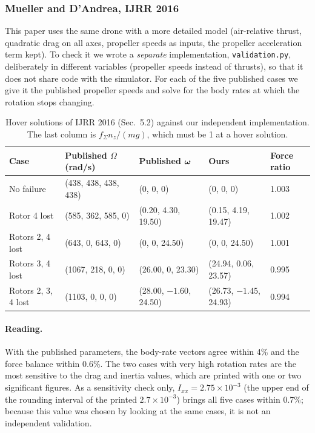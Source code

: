 \subsubsection{Mueller and D'Andrea, IJRR 2016}\label{sec:val-ijrr}
This paper uses the same drone with a more detailed model (air-relative thrust, quadratic drag on all axes, propeller speeds as inputs, the propeller acceleration term kept). To check it we wrote a \emph{separate} implementation, \texttt{validation.py}, deliberately in different variables (propeller speeds instead of thrusts), so that it does not share code with the simulator. For each of the five published cases we give it the published propeller speeds and solve for the body rates at which the rotation stops changing.

\begin{table}[h]
\centering\small
\caption{Hover solutions of IJRR 2016 (Sec.~5.2) against our independent implementation. The last column is $f_\Sigma n_z/(mg)$, which must be 1 at a hover solution.}\label{tab:val-ijrr}
\begin{tabular}{lllll}
\toprule
Case & Published $\Omega$ (rad/s) & Published $\boldsymbol{\omega}$ & Ours & Force ratio \\
\midrule
No failure & (438, 438, 438, 438) & (0, 0, 0) & (0, 0, 0) & 1.003 \\
Rotor 4 lost & (585, 362, 585, 0) & (0.20, 4.30, 19.50) & (0.15, 4.19, 19.47) & 1.002 \\
Rotors 2, 4 lost & (643, 0, 643, 0) & (0, 0, 24.50) & (0, 0, 24.50) & 1.001 \\
Rotors 3, 4 lost & (1067, 218, 0, 0) & (26.00, 0, 23.30) & (24.94, 0.06, 23.57) & 0.995 \\
Rotors 2, 3, 4 lost & (1103, 0, 0, 0) & (28.00, $-1.60$, 24.50) & (26.73, $-1.45$, 24.93) & 0.994 \\
\bottomrule
\end{tabular}
\end{table}

\paragraph{Reading.} With the published parameters, the body-rate vectors agree within 4\% and the force balance within 0.6\%. The two cases with very high rotation rates are the most sensitive to the drag and inertia values, which are printed with one or two significant figures. As a sensitivity check only, $I_{xx} = 2.75\times10^{-3}$ (the upper end of the rounding interval of the printed $2.7\times10^{-3}$) brings all five cases within 0.7\%; because this value was chosen by looking at the same cases, it is not an independent validation.


